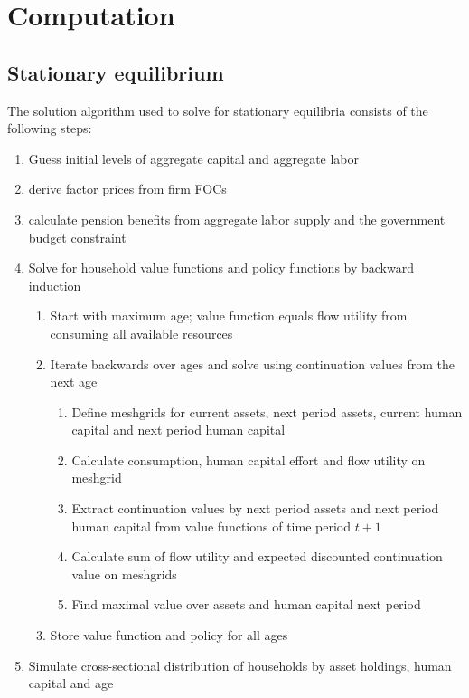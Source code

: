 \section{Computation}
\label{sec:computation}

\subsection{Stationary equilibrium}

The solution algorithm used to solve for stationary equilibria consists of the following steps:
\begin{enumerate}
    \item Guess initial levels of aggregate capital and aggregate labor
    \item derive factor prices from firm FOCs
    \item calculate pension benefits from aggregate labor supply and the government budget constraint
    \item Solve for household value functions and policy functions by backward induction
        \begin{enumerate}
            \item Start with maximum age; value function equals flow utility from consuming all available resources
            \item Iterate backwards over ages and solve using continuation values from the next age
                \begin{enumerate}
                    \item Define meshgrids for current assets, next period assets, current human capital and next period human capital
                    \item Calculate consumption, human capital effort and flow utility on meshgrid
                    \item Extract continuation values by next period assets and next period human capital from value functions of time period $t+1$
                    \item Calculate sum of flow utility and expected discounted continuation value on meshgrids
                    \item Find maximal value over assets and human capital next period
                \end{enumerate}
            \item Store value function and policy for all ages
        \end{enumerate}
    \item Simulate cross-sectional distribution of households by asset holdings, human capital and age

\end{enumerate}
